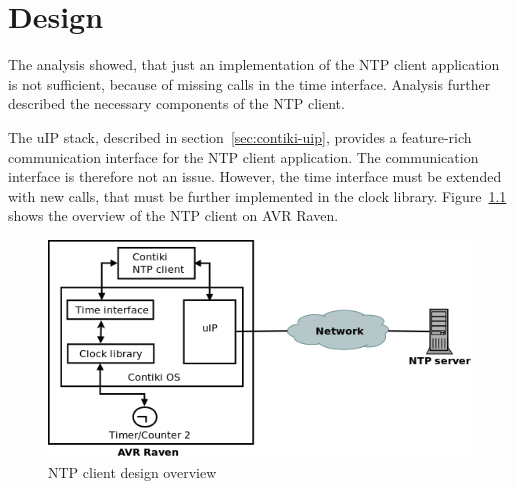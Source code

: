 
\chapter{Design}
The analysis showed, that just an implementation of the
NTP client application is not sufficient, because of missing calls in the time interface.
Analysis further described the necessary components of the NTP client.

The uIP stack, described in section~\ref{sec:contiki-uip}, provides a feature-rich
communication interface for the NTP client application.
The communication interface is therefore not an issue.
However, the time interface must be extended with new calls,
that must be further implemented in the clock library.
Figure~\ref{fig:design-overview} shows the overview of the NTP client on AVR Raven.

\begin{figure}[H]
  \centering
  \includegraphics[width=13cm,keepaspectratio]{fig/design.png}
  \caption{NTP client design overview}
  \label{fig:design-overview}
\end{figure}






